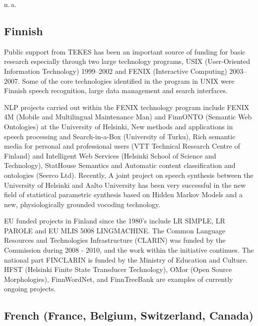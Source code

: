 \documentclass[10pt, plain]{../../metanetpaper}
\begin{document}
\begin{multicols}{2}
n.\,a.

\subsection*{Finnish}
\label{sec:finnish}

Public support from TEKES has been an important source of funding for basic research especially through two large technology programs, USIX (User-Oriented Information Technology) 1999--2002 and FENIX (Interactive Computing) 2003--2007. Some of the core technologies identified in the program in UNIX were Finnish speech recognition, large data management and search interfaces.

NLP projects carried out within the FENIX technology program include FENIX 4M (Mobile and Multilingual Maintenance Man) and FinnONTO (Semantic Web Ontologies) at the University of Helsinki, New methods and applications in speech processing and Search-in-a-Box (University of Turku), Rich semantic media for personal and professional users (VTT Technical Research Centre of Finland) and Intelligent Web Services (Helsinki School of Science and Technology), StatHouse Semantics and Automatic content classification and ontologies (Seerco Ltd).  Recently, A joint project on speech synthesis between the University of Helsinki and Aalto University has been very successful in the new field of statistical parametric synthesis based on Hidden Markov Models and a new, physiologically grounded vocoding technology.

EU funded projects in Finland since the 1980’s include LR SIMPLE, LR PAROLE and EU MLIS 5008 LINGMACHINE. The Common Language Resources and Technologies Infrastructure (CLARIN) was funded by the Commission during 2008 - 2010, and the work within the initiative continues. The national part FINCLARIN is funded by the Ministry of Education and Culture.  HFST (Helsinki Finite State Transducer Technology), OMor (Open Source Morphologies), FinnWordNet, and FinnTreeBank are examples of currently ongoing projects.

\subsection*{French (France, Belgium, Switzerland, Canada)}
\label{sec:french-france-belg}


\end{multicols}
\end{document}
